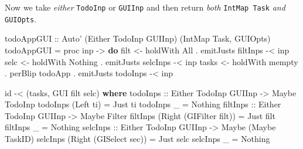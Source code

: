 \documentclass[]{article}
\newenvironment{Shaded}{}{}
\newcommand{\KeywordTok}[1]{\textcolor[rgb]{0.00,0.44,0.13}{\textbf{{#1}}}}
\newcommand{\DataTypeTok}[1]{\textcolor[rgb]{0.56,0.13,0.00}{{#1}}}
\newcommand{\OtherTok}[1]{\textcolor[rgb]{0.00,0.44,0.13}{{#1}}}
\newcommand{\FunctionTok}[1]{\textcolor[rgb]{0.02,0.16,0.49}{{#1}}}
\newcommand{\NormalTok}[1]{{#1}}
\begin{document}
Now we take \emph{either} \texttt{TodoInp} or \texttt{GUIInp} and then return
\emph{both} \texttt{IntMap\ Task} \emph{and} \texttt{GUIOpts}.

\begin{Shaded}
\begin{Highlighting}[]
\OtherTok{todoAppGUI ::} \DataTypeTok{Auto'} \NormalTok{(}\DataTypeTok{Either} \DataTypeTok{TodoInp} \DataTypeTok{GUIInp}\NormalTok{) (}\DataTypeTok{IntMap} \DataTypeTok{Task}\NormalTok{, }\DataTypeTok{GUIOpts}\NormalTok{)}
\NormalTok{todoAppGUI }\FunctionTok{=} \NormalTok{proc inp }\OtherTok{->} \KeywordTok{do}
    \NormalTok{filt  }\OtherTok{<-} \NormalTok{holdWith }\DataTypeTok{All}                      \FunctionTok{.} \NormalTok{emitJusts filtInps }\FunctionTok{-<} \NormalTok{inp}
    \NormalTok{selc  }\OtherTok{<-} \NormalTok{holdWith }\DataTypeTok{Nothing}                  \FunctionTok{.} \NormalTok{emitJusts selcInps }\FunctionTok{-<} \NormalTok{inp}
    \NormalTok{tasks }\OtherTok{<-} \NormalTok{holdWith mempty }\FunctionTok{.} \NormalTok{perBlip todoApp }\FunctionTok{.} \NormalTok{emitJusts todoInps }\FunctionTok{-<} \NormalTok{inp}

    \NormalTok{id }\FunctionTok{-<} \NormalTok{(tasks, }\DataTypeTok{GUI} \NormalTok{filt selc)}
  \KeywordTok{where}
\OtherTok{    todoInps ::} \DataTypeTok{Either} \DataTypeTok{TodoInp} \DataTypeTok{GUIInp} \OtherTok{->} \DataTypeTok{Maybe} \DataTypeTok{TodoInp}
    \NormalTok{todoInps (}\DataTypeTok{Left} \NormalTok{ti) }\FunctionTok{=} \DataTypeTok{Just} \NormalTok{ti}
    \NormalTok{todoInps _         }\FunctionTok{=} \DataTypeTok{Nothing}
\OtherTok{    filtInps ::} \DataTypeTok{Either} \DataTypeTok{TodoInp} \DataTypeTok{GUIInp} \OtherTok{->} \DataTypeTok{Maybe} \DataTypeTok{Filter}
    \NormalTok{filtInps (}\DataTypeTok{Right} \NormalTok{(}\DataTypeTok{GIFilter} \NormalTok{filt)) }\FunctionTok{=} \DataTypeTok{Just} \NormalTok{filt}
    \NormalTok{filtInps _                       }\FunctionTok{=} \DataTypeTok{Nothing}
\OtherTok{    selcInps ::} \DataTypeTok{Either} \DataTypeTok{TodoInp} \DataTypeTok{GUIInp} \OtherTok{->} \DataTypeTok{Maybe} \NormalTok{(}\DataTypeTok{Maybe} \DataTypeTok{TaskID}\NormalTok{)}
    \NormalTok{selcInps (}\DataTypeTok{Right} \NormalTok{(}\DataTypeTok{GISelect} \NormalTok{sec))  }\FunctionTok{=} \DataTypeTok{Just} \NormalTok{selc}
    \NormalTok{selcInps _                       }\FunctionTok{=} \DataTypeTok{Nothing}
\end{Highlighting}
\end{Shaded}
\end{document}
